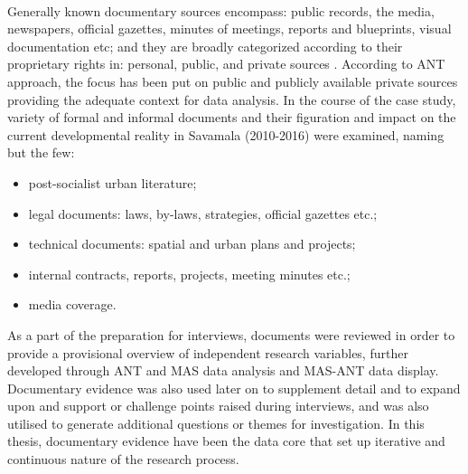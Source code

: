 \documentclass[11pt]{report}
\begin{document}
\\
Generally known documentary sources encompass: public records, the media, newspapers, official gazettes, minutes of meetings, reports and blueprints, visual documentation etc; and they are broadly categorized according to their proprietary rights in: personal, public, and private sources . According to ANT approach, the focus has been put on public and publicly available private sources providing the adequate context for data analysis. In the course of the case study, variety of formal and informal documents and their figuration and impact on the current developmental reality in Savamala (2010-2016) were examined, naming but the few:
\begin{itemize}
\item post-socialist urban literature;
\item legal documents: laws, by-laws, strategies, official gazettes etc.;
\item technical documents: spatial and urban plans and projects;
\item internal contracts, reports, projects, meeting minutes etc.;
\item media coverage. 
\end{itemize}

As  a  part  of  the  preparation  for  interviews,  documents  were  reviewed  in  order  to provide  a provisional overview of independent research variables, further developed through ANT and MAS data analysis and MAS-ANT data display. Documentary evidence was also used later on to supplement detail and to expand upon and support or challenge points raised during interviews, and was also utilised to generate additional questions or themes for investigation. In this thesis, documentary evidence have been the data core that set up iterative and continuous nature of the research process. 
\end{document}
